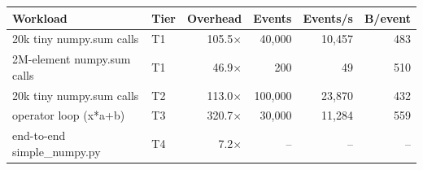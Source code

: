 \begin{tabular}{llrrrr}
\toprule
Workload & Tier & Overhead & Events & Events/s & B/event \\
\midrule
20k tiny numpy.sum calls & T1 & 105.5$\times$ & 40,000 & 10,457 & 483 \\
2M-element numpy.sum calls & T1 & 46.9$\times$ & 200 & 49 & 510 \\
20k tiny numpy.sum calls & T2 & 113.0$\times$ & 100,000 & 23,870 & 432 \\
operator loop (x*a+b) & T3 & 320.7$\times$ & 30,000 & 11,284 & 559 \\
end-to-end simple\_numpy.py & T4 & 7.2$\times$ & -- & -- & -- \\
\bottomrule
\end{tabular}
